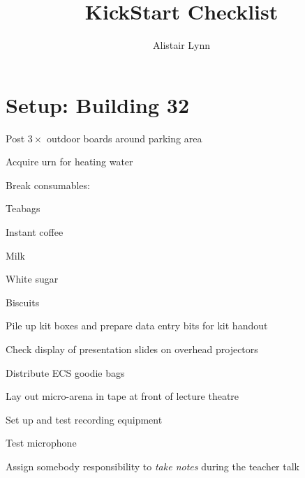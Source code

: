 \documentclass[pdftex,12pt,a4paper]{article}
\title{KickStart Checklist}
\author{Alistair Lynn}
\newcommand*{\thecheckbox}{\hss$\Box$}
\newenvironment*{checklist}
{\list{}{%
\renewcommand*{\makelabel}[1]{\thecheckbox}}}
{\endlist}
\begin{document}
\maketitle
\section{Setup: Building 32}
\begin{checklist}
\item Post $3\times$ outdoor boards around parking area
\item Acquire urn for heating water
\item Break consumables:
\begin{checklist}
\item Teabags
\item Instant coffee
\item Milk
\item White sugar
\item Biscuits
\end{checklist}
\item Pile up kit boxes and prepare data entry bits for kit handout
\item Check display of presentation slides on overhead projectors
\item Distribute ECS goodie bags
\item Lay out micro-arena in tape at front of lecture theatre
\item Set up and test recording equipment
\item Test microphone
\item Assign somebody responsibility to \emph{take notes} during the teacher talk
\end{checklist}
\end{document}

